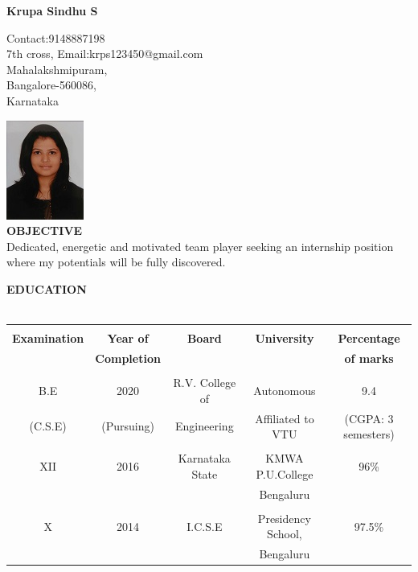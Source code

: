 \documentclass[letterpaper,11pt,oneside]{article}
\begin{document}
\begin{center}
\textbf{{\large Krupa Sindhu S}}\\
\end{center}
\vspace{-2ex}
\noindent\hrulefill
\vspace{1ex}

\small { \hfill  {Contact:9148887198}\\
	{7th cross,} \hfill  {Email:krps123450@gmail.com}\\
	{Mahalakshmipuram},\\
	{Bangalore-560086,}\\
	{Karnataka}}

 \hfill \includegraphics[scale=0.7]{krupa.jpg}\\
 
 \noindent\textbf{{\normalsize  OBJECTIVE}}\\
 \small {Dedicated, energetic and motivated team player seeking an internship position where my potentials will be fully discovered.\\}
 
 \noindent\textbf{{\normalsize  EDUCATION}}\\
 \\
 \begin{tabular}{ |c|c|c|c|c| } 
 	\hline
 	&&&&\\ 
 	\textbf{\large{Examination}} & \textbf{\large{Year of}} & \textbf{\large{Board}} & \textbf{\large{University}} & \textbf{\large{Percentage}} \\
 	& \textbf{Completion} & &  &\textbf{of marks}  \\
 	\hline
 	&&&&\\ 
 	B.E&2020 &R.V. College of & Autonomous  & 9.4\\   
 	(C.S.E)  &  (Pursuing) & Engineering &Affiliated to VTU   &(CGPA: 3 semesters) \\
 	\hline
 	&&&&\\ 
 	XII &2016  & Karnataka State & KMWA P.U.College &  96\% \\
 	&  & & Bengaluru & \\
 	\hline
 	&&&&\\ 
 	X & 2014   & I.C.S.E & Presidency School, & 97.5\% \\
 	&  & & Bengaluru & \\
 	\hline
 \end{tabular}
\end{document}
